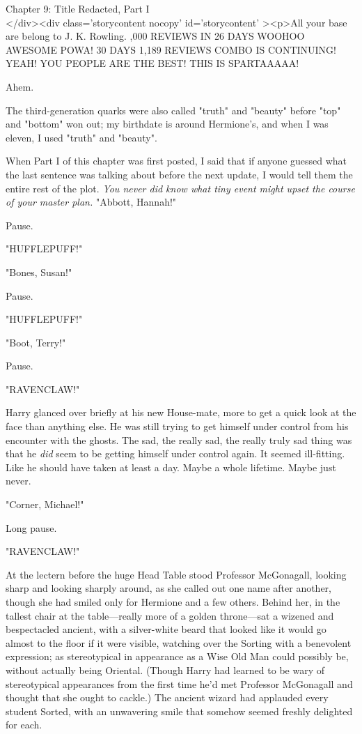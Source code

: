 
Chapter 9: Title Redacted, Part I\\
</div><div  class='storycontent nocopy' id='storycontent' ><p>All your base are 
belong to J. K. Rowling.
,000 REVIEWS IN 26 DAYS WOOHOO AWESOME POWA! 30 DAYS 1,189 REVIEWS COMBO IS 
CONTINUING! YEAH! YOU PEOPLE ARE THE BEST! THIS IS SPARTAAAAA!

Ahem.

The third-generation quarks were also called "truth" and "beauty" before "top" 
and "bottom" won out; my birthdate is around Hermione's, and when I was eleven, 
I used "truth" and "beauty".

When Part I of this chapter was first posted, I said that if anyone guessed 
what the last sentence was talking about before the next update, I would tell 
them the entire rest of the plot.
\sbreak
\emph{You never did know what tiny event might upset the course of your master 
plan.}
\sbreak
"Abbott, Hannah!"

Pause.

"HUFFLEPUFF!"

"Bones, Susan!"

Pause.

"HUFFLEPUFF!"

"Boot, Terry!"

Pause.

"RAVENCLAW!"

Harry glanced over briefly at his new House-mate, more to get a quick look at 
the face than anything else. He was still trying to get himself under control 
from his encounter with the ghosts. The sad, the really sad, the really truly 
sad thing was that he \emph{did} seem to be getting himself under control 
again. It seemed ill-fitting. Like he should have taken at least a day. Maybe a 
whole lifetime. Maybe just never.

"Corner, Michael!"

Long pause.

"RAVENCLAW!"

At the lectern before the huge Head Table stood Professor McGonagall, looking 
sharp and looking sharply around, as she called out one name after another, 
though she had smiled only for Hermione and a few others. Behind her, in the 
tallest chair at the table---really more of a golden throne---sat a wizened and 
bespectacled ancient, with a silver-white beard that looked like it would go 
almost to the floor if it were visible, watching over the Sorting with a 
benevolent expression; as stereotypical in appearance as a Wise Old Man could 
possibly be, without actually being Oriental. (Though Harry had learned to be 
wary of stereotypical appearances from the first time he'd met Professor 
McGonagall and thought that she ought to cackle.) The ancient wizard had 
applauded every student Sorted, with an unwavering smile that somehow seemed 
freshly delighted for each.

